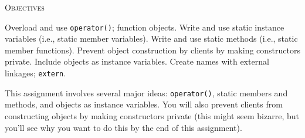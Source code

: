 
\textsc{Objectives}
  \begin{enumerate}[nosep]
    \li Overload and use \texttt{operator()}; function objects. 
    \li Write and use static instance variables (i.e., static member variables).
    \li Write and use static methods (i.e., static member functions).
    \li Prevent object construction by clients by making constructors private.
    \li Include objects as instance variables.
    \li Create names with external linkages; \verb!extern!.
  \end{enumerate}

This assignment involves several major ideas: \texttt{operator()},
static members and methods, and
objects as instance variables.
You will also prevent clients from constructing objects by
making constructors private (this might seem bizarre, but you'll
see why you want to do this by the end of this assignment).
